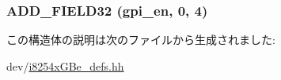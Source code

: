 \label{structiGbReg_1_1Regs_1_1CTRL__EXT_a8dd60ff9f975b2c50e4aebc366d2e3d5}
\hypertarget{structiGbReg_1_1Regs_1_1CTRL__EXT_a4c5d66f4397bc90d6f853031c67ef9cd}{
\subsubsection[{ADD\_\-FIELD32}]{\setlength{\rightskip}{0pt plus 5cm}ADD\_\-FIELD32 (gpi\_\-en, \/  0, \/  4)}}
\label{structiGbReg_1_1Regs_1_1CTRL__EXT_a4c5d66f4397bc90d6f853031c67ef9cd}


この構造体の説明は次のファイルから生成されました:\begin{DoxyCompactItemize}
\item 
dev/\hyperlink{i8254xGBe__defs_8hh}{i8254xGBe\_\-defs.hh}\end{DoxyCompactItemize}
